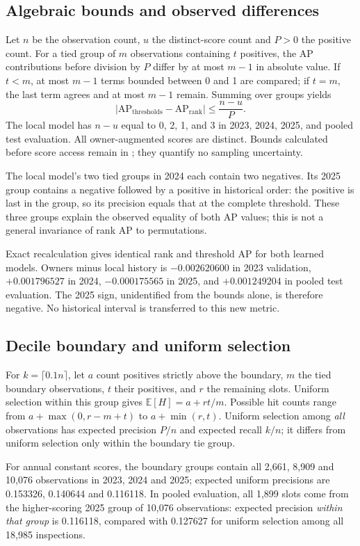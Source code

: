 \subsection{Algebraic bounds and observed differences}
Let $n$ be the observation count, $u$ the distinct-score count and $P>0$ the positive count. For a tied group of $m$ observations containing $t$ positives, the AP contributions before division by $P$ differ by at most $m-1$ in absolute value. If $t<m$, at most $m-1$ terms bounded between 0 and 1 are compared; if $t=m$, the last term agrees and at most $m-1$ remain. Summing over groups yields
\[
 |\mathrm{AP}_{\mathrm{thresholds}}-\mathrm{AP}_{\mathrm{rank}}|\le\frac{n-u}{P}.
\]
The local model has $n-u$ equal to 0, 2, 1, and 3 in 2023, 2024, 2025, and pooled test evaluation. All owner-augmented scores are distinct. Bounds calculated before score access remain in ; they quantify no sampling uncertainty.

The local model's two tied groups in 2024 each contain two negatives. Its 2025 group contains a negative followed by a positive in historical order: the positive is last in the group, so its precision equals that at the complete threshold. These three groups explain the observed equality of both AP values; this is not a general invariance of rank AP to permutations.

Exact recalculation gives identical rank and threshold AP for both learned models. Owners minus local history is $-0.002620600$ in 2023 validation, $+0.001796527$ in 2024, $-0.000175565$ in 2025, and $+0.001249204$ in pooled test evaluation. The 2025 sign, unidentified from the bounds alone, is therefore negative. No historical interval is transferred to this new metric.

\subsection{Decile boundary and uniform selection}
For $k=\lceil0.1n\rceil$, let $a$ count positives strictly above the boundary, $m$ the tied boundary observations, $t$ their positives, and $r$ the remaining slots. Uniform selection within this group gives $\mathbb{E}[H]=a+rt/m$. Possible hit counts range from $a+\max(0,r-m+t)$ to $a+\min(r,t)$. Uniform selection among \emph{all} observations has expected precision $P/n$ and expected recall $k/n$; it differs from uniform selection only within the boundary tie group.

For annual constant scores, the boundary groups contain all 2,661, 8,909 and 10,076 observations in 2023, 2024 and 2025; expected uniform precisions are 0.153326, 0.140644 and 0.116118. In pooled evaluation, all 1,899 slots come from the higher-scoring 2025 group of 10,076 observations: expected precision \emph{within that group} is 0.116118, compared with 0.127627 for uniform selection among all 18,985 inspections.

